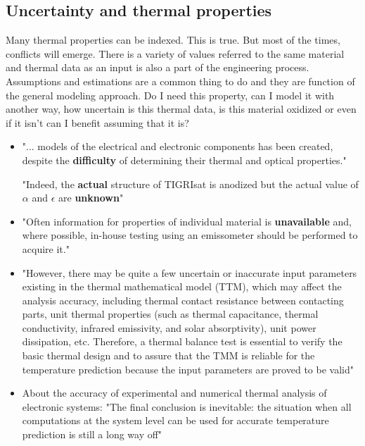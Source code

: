 \documentclass[final]{cubedoc}
\begin{document}
	
	\subsection{Uncertainty and thermal properties}
	
	
	Many thermal properties can be indexed. This is true. But most of the times, conflicts will emerge. There is a variety of values referred to the same material and thermal data as an input is also a part of the engineering process. Assumptions and estimations are a common thing to do and they are function of the general modeling approach. Do I need this property, can I model it with another way, how uncertain is this thermal data, is this material oxidized or even if it isn't can I benefit assuming that it is? 
	
	\begin{itemize}
		\item "... models of the electrical and electronic components has been created, despite the \textbf{difficulty} of determining their thermal and optical properties." 
		
		"Indeed, the \textbf{actual} structure of TIGRIsat is anodized but the actual value of $\alpha$  and $\epsilon$ are \textbf{unknown}" \cite{paris2015}
		
		\item "Often information for properties of individual material is \textbf{unavailable} and, where possible, in-house testing using an emissometer should be performed to acquire it." \cite{mccarron2018developing}
		
		
		\item "However, there may be quite a few uncertain or inaccurate input parameters existing in the thermal mathematical model (TTM), which may affect the analysis accuracy, including thermal contact resistance between contacting parts, unit thermal properties (such as thermal capacitance, thermal conductivity, infrared emissivity, and solar absorptivity), unit power dissipation, etc. Therefore, a thermal balance test is essential to verify the basic thermal design and to assure that the TMM is reliable for the temperature prediction because the input parameters are proved to be valid" \cite{tsai2004overview}
		
		
		
		
		\item About the accuracy of experimental and numerical thermal analysis of electronic systems: "The final conclusion is inevitable: the situation when all computations at the system level can be used for accurate temperature prediction is still a long way off" \cite{lasance2002}
	\end{itemize}
	
\end{document}
